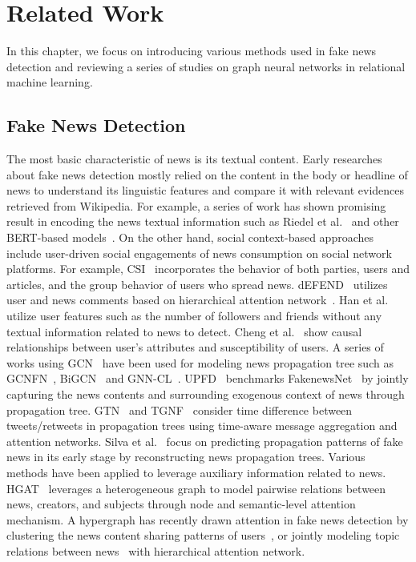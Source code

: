 \documentclass[conference]{IEEEtran}
\begin{document}
\section{Related Work}
In this chapter, we focus on introducing various methods used in fake news detection and reviewing a series of studies on graph neural networks in relational machine learning.


\subsection{Fake News Detection}
The most basic characteristic of news is its textual content. Early researches about fake news detection mostly relied on the content in the body or headline of news to understand its linguistic features and compare it with relevant evidences retrieved from Wikipedia\cite{hanselowski2018retrospective, thorne2018fever}. For example, a series of work has shown promising result in encoding the news textual information such as Riedel et al.~\cite{riedel2017simple} and other BERT-based models~\cite{kaliyar2021fakebert}. On the other hand, social context-based approaches include user-driven social engagements of news consumption on social network platforms. For example, CSI~\cite{ruchansky2017csi} incorporates the behavior of both parties, users and articles, and the group behavior of users who spread news. dEFEND~\cite{shu2019defend} utilizes user and news comments based on hierarchical attention network~\cite{yang2016hierarchical}. Han et al.~\cite{han2020graph} utilize user features such as the number of followers and friends without any textual information related to news to detect. Cheng et al.~\cite{cheng2021causal} show causal relationships between user's attributes and susceptibility of users. A series of works using GCN~\cite{kipf2016semi} have been used for modeling news propagation tree such as GCNFN~\cite{monti2019fake}, BiGCN~\cite{bian2020rumor} and GNN-CL~\cite{han2020graph}. UPFD~\cite{dou2021user} benchmarks FakenewsNet~\cite{shu2020fakenewsnet} by jointly capturing the news contents and surrounding exogenous context of news through propagation tree.  GTN~\cite{matsumoto2021propagation} and TGNF~\cite{song2021temporally} consider time difference between tweets/retweets in propagation trees using time-aware message aggregation and attention networks. Silva et al.~\cite{silva2021propagation2vec} focus on predicting propagation patterns of fake news in its early stage by reconstructing news propagation trees.   Various methods have been applied to leverage auxiliary information related to news. HGAT~\cite{ren2021fake} leverages a heterogeneous graph to model pairwise relations between news, creators, and subjects through node and semantic-level attention mechanism. A hypergraph has recently drawn attention in fake news detection by clustering the news content sharing patterns of users~\cite{muhuri2021hypergraph}, or jointly modeling topic relations between news~\cite{borse2022fake} with hierarchical attention network.
\end{document}
